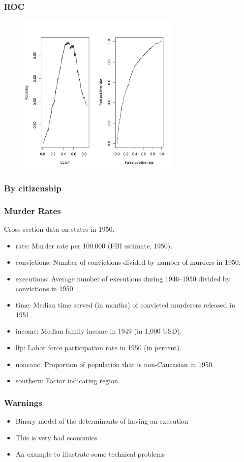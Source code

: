 \documentclass{beamer}
\newcommand{\1}{\mathbb{1}}
\begin{document}
\begin{frame}\frametitle{ROC}
\begin{figure}
\includegraphics[width = 8cm]{roc}
\end{figure}
\end{frame}

\begin{frame}\frametitle{By citizenship}

\end{frame}

\begin{frame}\frametitle{Murder Rates}
Cross-section data on states in 1950.
\begin{itemize}
 \item rate: Murder rate per 100,000 (FBI estimate, 1950).
 \item convictions: Number of convictions divided by number of murders in 1950.
 \item executions: Average number of executions during 1946--1950 divided by convictions in 1950.
\item time: Median time served (in months) of convicted murderers released in 1951.
\item income: Median family income in 1949 (in 1,000 USD).
\item lfp: Labor force participation rate in 1950 (in percent).
\item noncauc: Proportion of population that is non-Caucasian in 1950.
\item southern: Factor indicating region.
\end{itemize}
\end{frame}

\begin{frame}\frametitle{Warnings}
\begin{itemize}
\item Binary model of the determinants of having an execution
\item This is very bad economics
\item An example to illustrate some technical problems
\end{itemize}
\end{frame}
\end{document}
